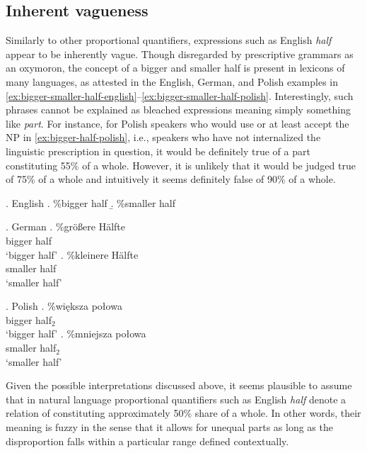 \subsection{Inherent vagueness}\label{sec:inherent-vagueness}
		
Similarly to other proportional quantifiers, expressions such as English \textit{half} appear to be inherently vague. Though disregarded by prescriptive grammars as an oxymoron, the concept of a bigger and smaller half is present in lexicons of many languages, as attested in the English, German, and Polish examples in \ref{ex:bigger-smaller-half-english}--\ref{ex:bigger-smaller-half-polish}. Interestingly, such phrases cannot be explained as bleached expressions meaning simply something like \textit{part}. For instance, for Polish speakers who would use or at least accept the NP in \ref{ex:bigger-half-polish}, i.e., speakers who have not internalized the linguistic prescription in question, it would be definitely true of a part constituting 55\% of a whole. However, it is unlikely that it would be judged true of 75\% of a whole and intuitively it seems definitely false of 90\% of a whole.

\ex.\label{ex:bigger-smaller-half-english} English
\a. \%bigger half\label{ex:bigger-half-english}
\b. \%smaller half\label{ex:smaller-half-english}

		\ex.\label{ex:bigger-smaller-half-german} German
        \ag. \%größere Hälfte\label{ex:bigger-half-german}\\
		bigger half\\
		`bigger half'
		\bg. \%kleinere Hälfte\label{ex:smaller-half-german}\\
		smaller half\\
		`smaller half'

		\ex.\label{ex:bigger-smaller-half-polish} Polish
        \ag. \%większa połowa\label{ex:bigger-half-polish}\\
		bigger half$_2$\\
		`bigger half'
		\bg. \%mniejsza połowa\label{ex:smaller-half-polish}\\
		smaller half$_2$\\
		`smaller half'

Given the possible interpretations discussed above, it seems plausible to assume that in natural language proportional quantifiers such as English \textit{half} denote a relation of constituting approximately 50\% share of a whole. In other words, their meaning is fuzzy in the sense that it allows for unequal parts as long as the disproportion falls within a particular range defined contextually.

